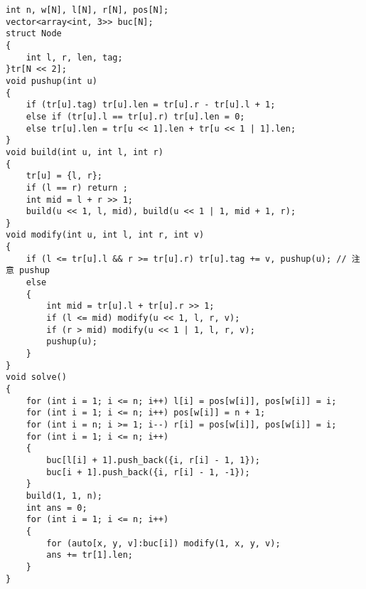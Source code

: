 \documentclass[a4paper,fontset=none]{ctexart}
\begin{document}
\begin{verbatim}
int n, w[N], l[N], r[N], pos[N];
vector<array<int, 3>> buc[N];
struct Node
{
    int l, r, len, tag;
}tr[N << 2];
void pushup(int u)
{
    if (tr[u].tag) tr[u].len = tr[u].r - tr[u].l + 1;
    else if (tr[u].l == tr[u].r) tr[u].len = 0;
    else tr[u].len = tr[u << 1].len + tr[u << 1 | 1].len;
}
void build(int u, int l, int r)
{
    tr[u] = {l, r};
    if (l == r) return ;
    int mid = l + r >> 1;
    build(u << 1, l, mid), build(u << 1 | 1, mid + 1, r);
}
void modify(int u, int l, int r, int v)
{
    if (l <= tr[u].l && r >= tr[u].r) tr[u].tag += v, pushup(u); // 注意 pushup
    else
    {
        int mid = tr[u].l + tr[u].r >> 1;
        if (l <= mid) modify(u << 1, l, r, v);
        if (r > mid) modify(u << 1 | 1, l, r, v);
        pushup(u);
    }
}
void solve()
{
    for (int i = 1; i <= n; i++) l[i] = pos[w[i]], pos[w[i]] = i;
    for (int i = 1; i <= n; i++) pos[w[i]] = n + 1;
    for (int i = n; i >= 1; i--) r[i] = pos[w[i]], pos[w[i]] = i;
    for (int i = 1; i <= n; i++)
    {
        buc[l[i] + 1].push_back({i, r[i] - 1, 1});
        buc[i + 1].push_back({i, r[i] - 1, -1});
    }
    build(1, 1, n);
    int ans = 0;
    for (int i = 1; i <= n; i++)
    {
        for (auto[x, y, v]:buc[i]) modify(1, x, y, v);
        ans += tr[1].len;
    }
}
\end{verbatim}
\end{document}
